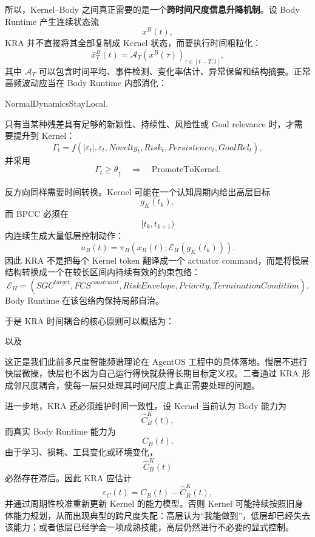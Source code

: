 所以，Kernel--Body 之间真正需要的是一个\textbf{跨时间尺度信息升降机制}。设 Body Runtime 产生连续状态流
\[
x^B(t),
\]
KRA 并不直接将其全部复制成 Kernel 状态，而要执行时间粗粒化：
\[
\bar x^B_T(t)
=
\mathcal A_T
\left(
x^B(\tau)
\right)_{\tau\in[t-T,t]},
\]
其中 $\mathcal A_T$ 可以包含时间平均、事件检测、变化率估计、异常保留和结构摘要。正常高频波动应当在 Body Runtime 内部消化：
\begin{statementbox}
NormalDynamicsStayLocal.
\end{statementbox}
只有当某种残差具有足够的新颖性、持续性、风险性或 Goal relevance 时，才需要提升到 Kernel：
\[
\Gamma_t
=
f
\left(
|\varepsilon_t|,
\dot\varepsilon_t,
Novelty_t,
Risk_t,
Persistence_t,
GoalRel_t
\right),
\]
并采用
\[
\Gamma_t\geq\theta_{\uparrow}
\quad\Rightarrow\quad
\mathrm{PromoteToKernel}.
\]

反方向同样需要时间转换。Kernel 可能在一个认知周期内给出高层目标
\[
g_K(t_k),
\]
而 BPCC 必须在
\[
[t_k,t_{k+1})
\]
内连续生成大量低层控制动作：
\[
u_B(t)
=
\pi_B
\left(
x_B(t);
\mathcal E_H(g_K(t_k))
\right).
\]
因此 KRA 不是把每个 Kernel token 翻译成一个 actuator command，而是将慢层结构转换成一个在较长区间内持续有效的约束包络：
\[
\boxed{
\mathcal E_H
=
\left(
SGC^{target},
FCS^{constraint},
RiskEnvelope,
Priority,
TerminationCondition
\right).
}
\]
Body Runtime 在该包络内保持局部自治。

于是 KRA 时间耦合的核心原则可以概括为：
\begin{statementbox}
\centering
{}
\end{statementbox}
以及
\begin{statementbox}
\centering
{}
\end{statementbox}

这正是我们此前多尺度智能频谱理论在 AgentOS 工程中的具体落地。慢层不进行快层微操，快层也不因为自己运行得快就获得长期目标定义权。二者通过 KRA 形成邻尺度耦合，使每一层只处理其时间尺度上真正需要处理的问题。

进一步地，KRA 还必须维护时间一致性。设 Kernel 当前认为 Body 能力为
\[
\hat C^K_B(t),
\]
而真实 Body Runtime 能力为
\[
C_B(t).
\]
由于学习、损耗、工具变化或环境变化，
\[
\hat C^K_B(t)
\]
必然存在滞后。因此 KRA 应估计
\[
\varepsilon_C(t)
=
C_B(t)-\hat C^K_B(t),
\]
并通过周期性校准重新更新 Kernel 的能力模型。否则 Kernel 可能持续按照旧身体能力规划，从而出现典型的跨尺度失配：高层认为``我能做到''，低层却已经失去该能力；或者低层已经学会一项成熟技能，高层仍然进行不必要的显式控制。

